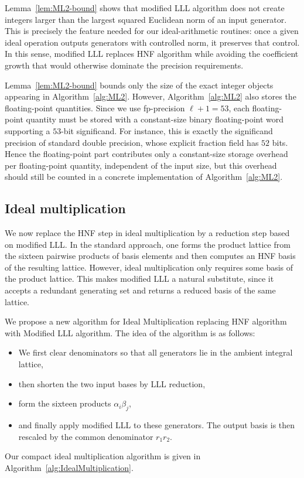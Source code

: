 
Lemma~\ref{lem:ML2-bound} shows that modified LLL algorithm does not create integers larger than the largest squared Euclidean norm of an input generator. This is precisely the feature needed for our ideal-arithmetic routines: once a given ideal operation outputs generators with controlled norm, it preserves that control. In this sense, modified LLL replaces HNF algorithm while avoiding the coefficient growth that would otherwise dominate the precision requirements.

\begin{remark}
\label{rem:ML2-fp-overhead}
Lemma~\ref{lem:ML2-bound} bounds only the size of the exact integer objects appearing in Algorithm~\ref{alg:ML2}.
However, Algorithm~\ref{alg:ML2} also stores the floating-point quantities.
Since we use fp-precision $\ell+1=53$, each floating-point quantity must be stored with a constant-size binary floating-point word supporting a $53$-bit significand.
For instance, this is exactly the significand precision of standard double precision, whose explicit fraction field has $52$ bits.
Hence the floating-point part contributes only a constant-size storage overhead per floating-point quantity, independent of the input size, but this overhead should still be counted in a concrete implementation of Algorithm~\ref{alg:ML2}.
\end{remark}

\subsection{Ideal multiplication}
\label{subsec:idealmultiplication}

We now replace the HNF step in ideal multiplication by a reduction step based on modified LLL. In the standard approach, one forms the product lattice from the sixteen pairwise products of basis elements and then computes an HNF basis of the resulting lattice. However, ideal multiplication only requires some basis of the product lattice. This makes modified LLL a natural substitute, since it accepts a redundant generating set and returns a reduced basis of the same lattice.

We propose a new algorithm for Ideal Multiplication replacing HNF algorithm with Modified LLL algorithm. The idea of the algorithm is as follows:
\begin{itemize}
\item We first clear denominators so that all generators lie in the ambient integral lattice,
\item then shorten the two input bases by LLL reduction,
\item form the sixteen products $\alpha_i\beta_j$,
\item and finally apply modified LLL to these generators. The output basis is then rescaled by the common denominator $r_1r_2$.
\end{itemize}
Our compact ideal multiplication algorithm is given in Algorithm~\ref{alg:IdealMultiplication}.


